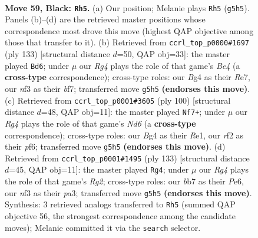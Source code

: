 \documentclass[11pt]{article}
\begin{document}
\clearpage

\begin{figure}[p]\centering
\begin{subfigure}{0.46\textwidth}\centering
\resizebox{\linewidth}{!}{%
\newchessgame
\chessboard[
  setfen={8/1B1k4/8/B5r1/PK4bp/1P3N2/5R2/8 b - - 0 59},
  showmover=false,
  pgfstyle=straightmove, color=movearrow, markmove={g5-h5}
]}
\caption{}
\end{subfigure}\hfill
\begin{subfigure}{0.46\textwidth}\centering
\resizebox{\linewidth}{!}{%
\newchessgame
\chessboard[
  setfen={8/2k1rB2/8/2p1bR2/2K5/1PP5/8/8 b - - 10 67},
  showmover=false,
  pgfstyle=straightmove, color=movearrow, markmove={e5-d6}
]}
\caption{}
\end{subfigure}
\\[4pt]
\begin{subfigure}{0.46\textwidth}\centering
\resizebox{\linewidth}{!}{%
\newchessgame
\chessboard[
  setfen={1r5k/7p/3N1p1P/5np1/2B5/8/2b2K2/4R3 w - - 0 51},
  showmover=false,
  pgfstyle=straightmove, color=movearrow, markmove={d6-f7}
]}
\caption{}
\end{subfigure}\hfill
\begin{subfigure}{0.46\textwidth}\centering
\resizebox{\linewidth}{!}{%
\newchessgame
\chessboard[
  setfen={8/2k3r1/4p3/5p2/1P6/P6R/1b3PB1/5K2 b - - 8 67},
  showmover=false,
  pgfstyle=straightmove, color=movearrow, markmove={g7-g4}
]}
\caption{}
\end{subfigure}
\caption{\textbf{Move 59, Black: \texttt{Rh5}.} (a) Our position; Melanie plays \texttt{Rh5} (\texttt{g5h5}). Panels (b)--(d) are the retrieved master positions whose correspondence most drove this move (highest QAP objective among those that transfer to it). (b) Retrieved from \texttt{ccrl\_top\_p0000\#1697} (ply 133) [structural distance $d$=50, QAP obj=33]: the master played \texttt{Bd6}; under $\mu$ our \emph{Rg4} plays the role of that game's \emph{Be4} (a \textbf{cross-type} correspondence); cross-type roles: our \emph{B}g4 as their \emph{R}e7, our \emph{n}f3 as their \emph{b}f7; transferred move \texttt{g5h5} \textbf{(endorses this move)}. (c) Retrieved from \texttt{ccrl\_top\_p0001\#3605} (ply 100) [structural distance $d$=48, QAP obj=11]: the master played \texttt{Nf7+}; under $\mu$ our \emph{Rg4} plays the role of that game's \emph{Nd6} (a \textbf{cross-type} correspondence); cross-type roles: our \emph{B}g4 as their \emph{R}e1, our \emph{r}f2 as their \emph{p}f6; transferred move \texttt{g5h5} \textbf{(endorses this move)}. (d) Retrieved from \texttt{ccrl\_top\_p0001\#1495} (ply 133) [structural distance $d$=45, QAP obj=11]: the master played \texttt{Rg4}; under $\mu$ our \emph{Rg4} plays the role of that game's \emph{Rg2}; cross-type roles: our \emph{b}b7 as their \emph{P}e6, our \emph{n}f3 as their \emph{p}a3; transferred move \texttt{g5h5} \textbf{(endorses this move)}. Synthesis: 3 retrieved analogs transferred to \texttt{Rh5} (summed QAP objective 56, the strongest correspondence among the candidate moves); Melanie committed it via the \texttt{search} selector.}
\label{fig:thought-m117}
\end{figure}
\end{document}
